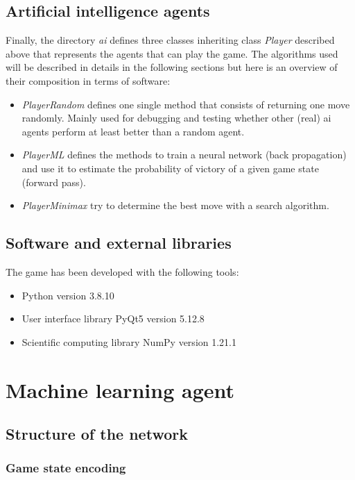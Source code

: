 \documentclass{article}
\begin{document}
\subsection{Artificial intelligence agents}

Finally, the directory \textit{ai} defines three classes inheriting class \textit{Player} described above that represents the agents that can play the game. The algorithms used will be described in details in the following sections but here is an overview of their composition in terms of software:

\begin{itemize}
    \item \textit{PlayerRandom} defines one single method that consists of returning one move randomly. Mainly used for debugging and testing whether other (real) ai agents perform at least better than a random agent.
    \item \textit{PlayerML} defines the methods to train a neural network (back propagation) and use it to estimate the probability of victory of a given game state (forward pass).
    \item \textit{PlayerMinimax} try to determine the best move with a search algorithm.
\end{itemize}

\subsection{Software and external libraries}

The game has been developed with the following tools:

\begin{itemize}
    \item Python version 3.8.10
    \item User interface library PyQt5 version 5.12.8
    \item Scientific computing library NumPy version 1.21.1
\end{itemize}

\section{Machine learning agent}

\subsection{Structure of the network}

\subsubsection{Game state encoding}
\end{document}
